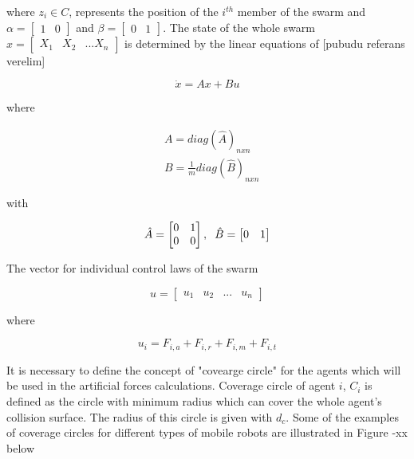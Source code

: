 where  $z_i \in C$, represents the position of the $i^{th}$ member of the swarm and $\alpha = \begin{bmatrix}
1 & 0
\end{bmatrix}$ and $\beta = \begin{bmatrix}
0 & 1
\end{bmatrix}$. The state of the whole swarm $x= \begin{bmatrix}
X_1 & X_2 & ... X_n
\end{bmatrix}$ is determined by the linear equations of [pubudu referans verelim]

\begin{equation}
\dot{x} = Ax + Bu
\end{equation}

where

\begin{align*}
&A = diag\left(\hat{A}\right)_{nxn}\\
&B = \frac{1}{m} diag\left(\hat{B}\right)_{nxn}
\end{align*}
			
with

\begin{equation}
\hat{A} = \begin{bmatrix}
0&1\\0&0
\end{bmatrix} , \hspace{0.2cm} \hat{B} = \begin{bmatrix}
0&1
\end{bmatrix}
\end{equation}
			
The vector for individual control laws of the swarm

\begin{equation}
u = \begin{bmatrix}
u_1 & u_2 & ... & u_n
\end{bmatrix}
\end{equation}

where

\begin{equation}
u_i = F_{i,a} + F_{i,r} + F_{i,m} + F_{i,t}
\end{equation}

It is necessary to define the concept of "covearge circle"	for the agents which will be used in the artificial forces calculations. Coverage circle of agent $i$, $C_i$ is defined as the circle with minimum radius which can cover the whole agent's collision surface. The radius of this circle is given with $d_c$. Some of the examples of coverage circles for different types of mobile robots are illustrated in Figure -xx below
		
